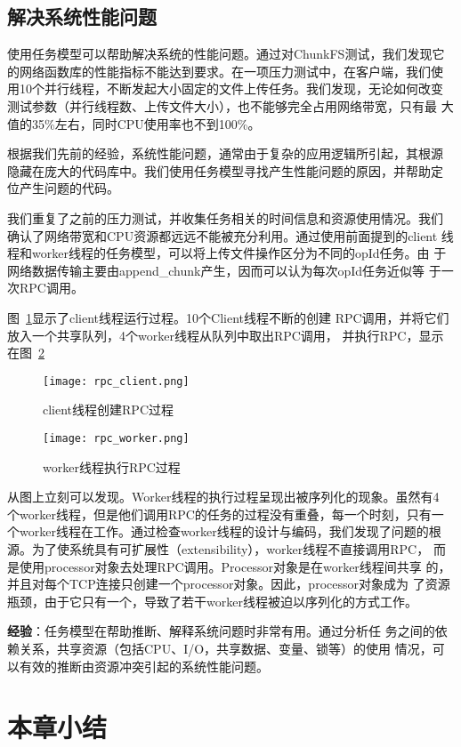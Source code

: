 \subsection{解决系统性能问题}

使用任务模型可以帮助解决系统的性能问题。通过对ChunkFS测试，我们发现它
的网络函数库的性能指标不能达到要求。在一项压力测试中，在客户端，我们使
用10个并行线程，不断发起大小固定的文件上传任务。我们发现，无论如何改变
测试参数（并行线程数、上传文件大小），也不能够完全占用网络带宽，只有最
大值的35\%左右，同时CPU使用率也不到100\%。

根据我们先前的经验，系统性能问题，通常由于复杂的应用逻辑所引起，其根源
隐藏在庞大的代码库中。我们使用任务模型寻找产生性能问题的原因，并帮助定
位产生问题的代码。

我们重复了之前的压力测试，并收集任务相关的时间信息和资源使用情况。我们
确认了网络带宽和CPU资源都远远不能被充分利用。通过使用前面提到的client
线程和worker线程的任务模型，可以将上传文件操作区分为不同的opId任务。由
于网络数据传输主要由append\_chunk产生，因而可以认为每次opId任务近似等
于一次RPC调用。


图~\ref{fig:rpc_client}显示了client线程运行过程。10个Client线程不断的创建
RPC调用，并将它们放入一个共享队列，4个worker线程从队列中取出RPC调用，
并执行RPC，显示在图~\ref{fig:rpc_worker}
 
\begin{figure}
  \centering
  \begin{minipage}{0.8\linewidth}
    \centering
    \texttt{[image: rpc\_client.png]}
    \caption{client线程创建RPC过程}
    \label{fig:rpc_client}
  \end{minipage}
\end{figure}

\begin{figure}
  \centering
  \begin{minipage}{0.8\linewidth}
    \centering
    \texttt{[image: rpc\_worker.png]}
    \caption{worker线程执行RPC过程}
    \label{fig:rpc_worker}
  \end{minipage}
\end{figure}

从图上立刻可以发现。Worker线程的执行过程呈现出被序列化的现象。虽然有4
个worker线程，但是他们调用RPC的任务的过程没有重叠，每一个时刻，只有一
个worker线程在工作。通过检查worker线程的设计与编码，我们发现了问题的根
源。为了使系统具有可扩展性（extensibility），worker线程不直接调用RPC，
而是使用processor对象去处理RPC调用。Processor对象是在worker线程间共享
的，并且对每个TCP连接只创建一个processor对象。因此，processor对象成为
了资源瓶颈，由于它只有一个，导致了若干worker线程被迫以序列化的方式工作。

\textbf{经验}：任务模型在帮助推断、解释系统问题时非常有用。通过分析任
务之间的依赖关系，共享资源（包括CPU、I/O，共享数据、变量、锁等）的使用
情况，可以有效的推断由资源冲突引起的系统性能问题。

\section{本章小结}
\label{lm_conclusion}
